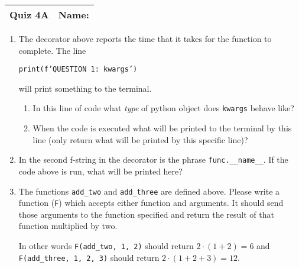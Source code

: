 \documentclass[11pt]{article}
\begin{document}
\clearpage

\begin{tabularx}{\textwidth}{l|X}
\textbf{Quiz 4A} &   \textbf{Name: } \\
\hline
\end{tabularx}

\vspace{1cm}

\begin{enumerate}
\item The decorator above reports the time that it takes for the function to complete. The line 

\texttt{print(f'QUESTION 1: {kwargs}')} 

will print something to the terminal. 
	\begin{enumerate} 
		\item In this line of code what \emph{type} of python object does \texttt{kwargs} behave like?
		\vspace{2.5cm}
		\item When the code is executed what will be printed to the terminal by this line (only return what will be printed by this specific line)?
		\vspace{2.5cm}
	\end{enumerate}
\item In the second f-string in the decorator is the phrase \texttt{func.\_\_name\_\_}. If the code above is run, what will be printed here?
		\vspace{2.5cm}

\item The functions \texttt{add\_two} and \texttt{add\_three} are defined above. Please write a function (\texttt{F}) which accepts either function and arguments. It should send those arguments to the function specified and return the result of that function multiplied by two. 

In other words \texttt{F(add\_two, 1, 2)} should return $2 \cdot (1 + 2) = 6$ and \texttt{F(add\_three, 1, 2, 3)} should return $2 \cdot (1 + 2 + 3) = 12$. 

	\vspace{3.5cm}
	
	 
\end{enumerate}
\end{document}
